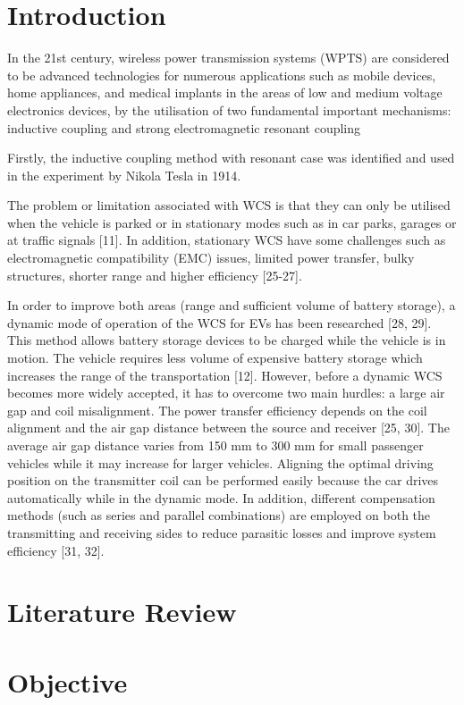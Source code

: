 \documentclass[12pt]{article}
\begin{document}
\section{Introduction}
In the 21st century, wireless power transmission
systems (WPTS) are considered to be advanced technologies for numerous applications
such as mobile devices, home appliances, and medical implants in the areas of low and
medium voltage electronics devices, by the utilisation of two fundamental important
mechanisms: inductive coupling and strong electromagnetic resonant coupling %

Firstly, the inductive coupling method with resonant case was identified and used in the
experiment by Nikola Tesla in 1914.

The problem or limitation associated with WCS is that they can only be
utilised when the vehicle is parked or in stationary modes such as in car parks, garages or
at traffic signals [11]. In addition, stationary WCS have some challenges such as
electromagnetic compatibility (EMC) issues, limited power transfer, bulky structures,
shorter range and higher efficiency [25-27].

In order to improve both areas (range and sufficient volume of battery storage), a dynamic
mode of operation of the WCS for EVs has been researched [28, 29]. This method allows
battery storage devices to be charged while the vehicle is in motion. The vehicle requires
less volume of expensive battery storage which increases the range of the transportation
[12]. However, before a dynamic WCS becomes more widely accepted, it has to
overcome two main hurdles: a large air gap and coil misalignment. The power transfer
efficiency depends on the coil alignment and the air gap distance between the source and
receiver [25, 30]. The average air gap distance varies from 150 mm to 300 mm for small
passenger vehicles while it may increase for larger vehicles. Aligning the optimal driving
position on the transmitter coil can be performed easily because the car drives
automatically while in the dynamic mode. In addition, different compensation methods
(such as series and parallel combinations) are employed on both the transmitting and
receiving sides to reduce parasitic losses and improve system efficiency [31, 32].
\cite{knupfer2017electrifying}
\section{Literature Review}

\section{Objective}
\end{document}

